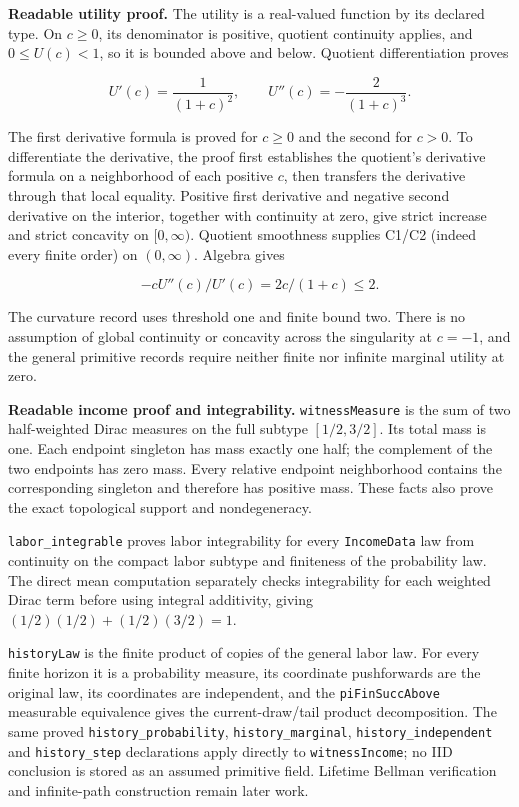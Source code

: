 \documentclass[
  11pt,
]{article}
\let\LedgerOriginalTexttt\texttt
\renewcommand{\texttt}[1]{{\small\LedgerOriginalTexttt{#1}}}
\begin{document}
\textbf{Readable utility proof.} The utility is a real-valued function
by its declared type. On \(c\geq0\), its denominator is positive,
quotient continuity applies, and \(0\leq U(c)<1\), so it is bounded
above and below. Quotient differentiation proves

\[U'(c)=\frac{1}{(1+c)^2},\qquad U''(c)=-\frac{2}{(1+c)^3}.\]

The first derivative formula is proved for \(c\geq0\) and the second for
\(c>0\). To differentiate the derivative, the proof first establishes
the quotient's derivative formula on a neighborhood of each positive
\(c\), then transfers the derivative through that local equality.
Positive first derivative and negative second derivative on the
interior, together with continuity at zero, give strict increase and
strict concavity on \([0,\infty)\). Quotient smoothness supplies C1/C2
(indeed every finite order) on \((0,\infty)\). Algebra gives

\[-cU''(c)/U'(c)=2c/(1+c)\leq2.\]

The curvature record uses threshold one and finite bound two. There is
no assumption of global continuity or concavity across the singularity
at \(c=-1\), and the general primitive records require neither finite
nor infinite marginal utility at zero.

\textbf{Readable income proof and integrability.}
\texttt{witnessMeasure} is the sum of two half-weighted Dirac measures
on the full subtype \([1/2,3/2]\). Its total mass is one. Each endpoint
singleton has mass exactly one half; the complement of the two endpoints
has zero mass. Every relative endpoint neighborhood contains the
corresponding singleton and therefore has positive mass. These facts
also prove the exact topological support and nondegeneracy.

\texttt{labor\_integrable} proves labor integrability for every
\texttt{IncomeData} law from continuity on the compact labor subtype and
finiteness of the probability law. The direct mean computation
separately checks integrability for each weighted Dirac term before
using integral additivity, giving \((1/2)(1/2)+(1/2)(3/2)=1\).

\texttt{historyLaw} is the finite product of copies of the general labor
law. For every finite horizon it is a probability measure, its
coordinate pushforwards are the original law, its coordinates are
independent, and the \texttt{piFinSuccAbove} measurable equivalence
gives the current-draw/tail product decomposition. The same proved
\texttt{history\_probability}, \texttt{history\_marginal},
\texttt{history\_independent} and \texttt{history\_step} declarations
apply directly to \texttt{witnessIncome}; no IID conclusion is stored as
an assumed primitive field. Lifetime Bellman verification and
infinite-path construction remain later work.
\end{document}

